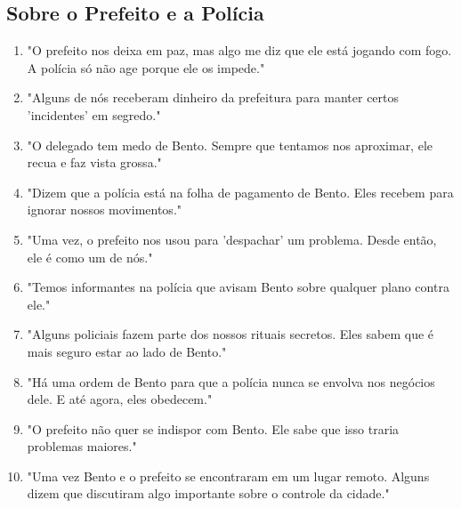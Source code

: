 \subsection*{Sobre o Prefeito e a Polícia}
\begin{enumerate}
    \item "O prefeito nos deixa em paz, mas algo me diz que ele está jogando com fogo. A polícia só não age porque ele os impede."
    \item "Alguns de nós receberam dinheiro da prefeitura para manter certos 'incidentes' em segredo."
    \item "O delegado tem medo de Bento. Sempre que tentamos nos aproximar, ele recua e faz vista grossa."
    \item "Dizem que a polícia está na folha de pagamento de Bento. Eles recebem para ignorar nossos movimentos."
    \item "Uma vez, o prefeito nos usou para 'despachar' um problema. Desde então, ele é como um de nós."
    \item "Temos informantes na polícia que avisam Bento sobre qualquer plano contra ele."
    \item "Alguns policiais fazem parte dos nossos rituais secretos. Eles sabem que é mais seguro estar ao lado de Bento."
    \item "Há uma ordem de Bento para que a polícia nunca se envolva nos negócios dele. E até agora, eles obedecem."
    \item "O prefeito não quer se indispor com Bento. Ele sabe que isso traria problemas maiores."
    \item "Uma vez Bento e o prefeito se encontraram em um lugar remoto. Alguns dizem que discutiram algo importante sobre o controle da cidade."
\end{enumerate}

